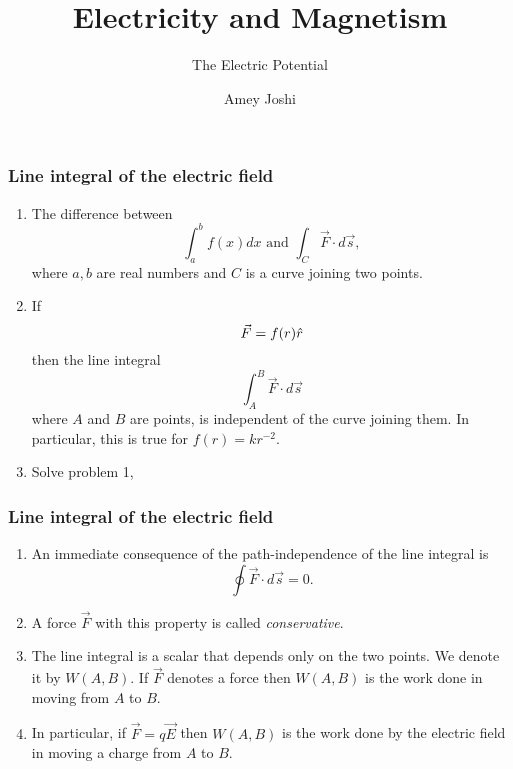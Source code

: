 \documentclass{beamer}
\title{Electricity and Magnetism}
\subtitle{The Electric Potential}
\author{Amey Joshi}
\begin{document}
\frame{\titlepage}

\begin{frame}
\frametitle{Line integral of the electric field}
\begin{enumerate}
\item The difference between
\begin{equation}\label{e1}
\int_a^b f(x)dx \text{ and } \int_C \vec{F}\cdot d\vec{s},
\end{equation}
where $a, b$ are real numbers and $C$ is a curve joining two points.
\item If 
\begin{equation}\label{e2}
\vec{F} = f(r)\hat{r}
\end{equation}
then the line integral
\begin{equation}\label{e3}
\int_A^B \vec{F}\cdot d\vec{s}
\end{equation}
where $A$ and $B$ are points, is independent of the curve joining them. In
particular, this is true for $f(r) = kr^{-2}$.
\item Solve problem 1,
\end{enumerate}
\end{frame}

\begin{frame}
\frametitle{Line integral of the electric field}
\begin{enumerate}
\item An immediate consequence of the path-independence of the line integral is
\begin{equation}\label{e4}
\oint\vec{F}\cdot d\vec{s} = 0.
\end{equation}
\item A force $\vec{F}$ with this property is called \emph{conservative}.
\item The line integral is a scalar that depends only on the two points.
We denote it by $W(A, B)$. If $\vec{F}$ denotes a force then $W(A, B)$ is the
work done in moving from $A$ to $B$.
\item In particular, if $\vec{F} = q\vec{E}$ then $W(A, B)$ is the work done
by the electric field in moving a charge from $A$ to $B$.
\end{enumerate}
\end{frame}
\end{document}
